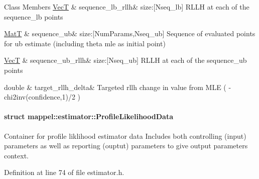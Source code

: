 \begin{DoxyFields}{Class Members}
\hyperlink{namespacemappel_a2225ad69f358daa3f4f99282a35b9a3a}{VecT}\hypertarget{namespacemappel_1_1estimator_a494ce70c7c79260ba82816f28c67659b}{}\label{namespacemappel_1_1estimator_a494ce70c7c79260ba82816f28c67659b}
&
sequence\+\_\+lb\+\_\+rllh&
size\+:\mbox{[}Nseq\+\_\+lb\mbox{]} R\+L\+LH at each of the sequence\+\_\+lb points \\
\hline

\hyperlink{namespacemappel_a7091ab87c528041f7e2027195fad8915}{MatT}\hypertarget{namespacemappel_1_1estimator_a228d934c7ce4448d22d93dd3cf3843d5}{}\label{namespacemappel_1_1estimator_a228d934c7ce4448d22d93dd3cf3843d5}
&
sequence\+\_\+ub&
size\+:\mbox{[}Num\+Params,Nseq\+\_\+ub\mbox{]} Sequence of evaluated points for ub estimate (including theta mle as initial point) \\
\hline

\hyperlink{namespacemappel_a2225ad69f358daa3f4f99282a35b9a3a}{VecT}\hypertarget{namespacemappel_1_1estimator_ace894418986139f62b6d0c267db852b5}{}\label{namespacemappel_1_1estimator_ace894418986139f62b6d0c267db852b5}
&
sequence\+\_\+ub\+\_\+rllh&
size\+:\mbox{[}Nseq\+\_\+ub\mbox{]} R\+L\+LH at each of the sequence\+\_\+ub points \\
\hline

double\hypertarget{namespacemappel_1_1estimator_aaceb78a7bb02e7d5bf776d908f0051f9}{}\label{namespacemappel_1_1estimator_aaceb78a7bb02e7d5bf776d908f0051f9}
&
target\+\_\+rllh\+\_\+delta&
Targeted rllh change in value from M\+LE ( -\/chi2inv(confidence,1)/2 ) \\
\hline

\end{DoxyFields}
\label{structmappel_1_1estimator_1_1ProfileLikelihoodData}
\hypertarget{namespacemappel_1_1estimator_structmappel_1_1estimator_1_1ProfileLikelihoodData}{}
\paragraph{struct mappel\+:\+:estimator\+:\+:Profile\+Likelihood\+Data}
Container for profile liklihood estimator data Includes both controlling (input) parameters as well as reporting (ouptut) parameters to give output parameters context. 

Definition at line 74 of file estimator.\+h.

